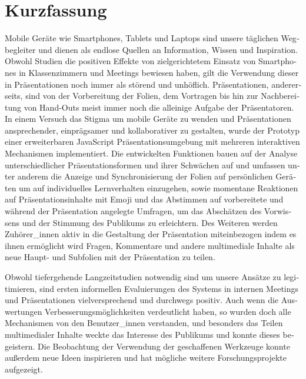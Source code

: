 \chapter{Kurzfassung}

\begin{german}
Mobile Geräte wie Smartphones, Tablets und Laptops sind unsere täglichen Wegbegleiter und dienen als endlose Quellen an Information, Wissen und Inspiration. Obwohl Studien die positiven Effekte von zielgerichtetem Einsatz von Smartphones in Klassenzimmern und Meetings bewiesen haben, gilt die Verwendung dieser in Präsentationen noch immer als störend und unhöflich. Präsentationen, andererseits, sind von der Vorbereitung der Folien, dem Vortragen bis hin zur Nachbereitung von Hand-Outs meist immer noch die alleinige Aufgabe der Präsentatoren. In einem Versuch das Stigma um mobile Geräte zu wenden und Präsentationen ansprechender, einprägsamer und kollaborativer zu gestalten, wurde der Prototyp einer erweiterbaren JavaScript Präsentationsumgebung mit mehreren interaktiven Mechanismen implementiert. Die entwickelten Funktionen bauen auf der Analyse unterschiedlicher Präsentationsformen und ihrer Schwächen auf und umfassen unter anderem die Anzeige und Synchronisierung der Folien auf persönlichen Geräten um auf individuelles Lernverhalten einzugehen, sowie momentane Reaktionen auf Präsentationsinhalte mit Emoji und das Abstimmen auf vorbereitete und während der Präsentation angelegte Umfragen, um das Abschätzen des Vorwissens und der Stimmung des Publikums zu erleichtern. Des Weiteren werden Zuhörer\_innen aktiv in die Gestaltung der Präsentation miteinbezogen indem es ihnen ermöglicht wird Fragen, Kommentare und andere multimediale Inhalte als neue Haupt- und Subfolien mit der Präsentation zu teilen.

Obwohl tiefergehende Langzeitstudien notwendig sind um unsere Ansätze zu legitimieren, sind ersten informellen Evaluierungen des Systems in internen Meetings und Präsentationen vielversprechend und durchwegs positiv. Auch wenn die Auswertungen Verbesserungsmöglichkeiten verdeutlicht haben, so wurden doch alle Mechanismen von den Benutzer\_innen verstanden, und besonders das Teilen multimedialer Inhalte weckte das Interesse des Publikums und konnte dieses begeistern. Die Beobachtung der Verwendung der geschaffenen Werkzeuge konnte außerdem neue Ideen inspirieren und hat mögliche weitere Forschungsprojekte aufgezeigt.
\end{german}